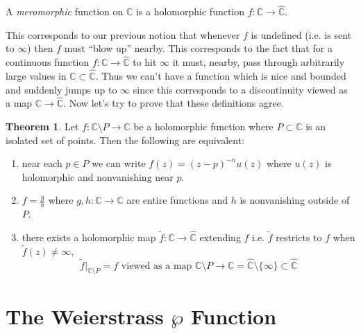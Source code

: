 \documentclass{article}
\newcommand{\C}{\mathbb{C}}
\theoremstyle{definition}
\newtheorem{theorem}{Theorem}[section]
\newenvironment{definition}[1][Definition:]{\begin{trivlist}
\item[\hskip \labelsep {\bfseries #1}]}{\end{trivlist}}
\begin{document}
\begin{definition}
A \textit{meromorphic} function on $\C$ is a holomorphic function $f : \C \to \hat{\C}$.
\end{definition}
\noindent
This corresponds to our previous notion that whenever $f$ is undefined (i.e. is sent to $\infty$) then $f$
must “blow up” nearby. This corresponds to the fact that for a continuous function $f : \C \to \hat{\C}$ to hit $\infty$ it must, nearby, pass through arbitrarily large values in $\C \subset \hat{\C}$. Thus we can’t have a function which is nice and bounded and suddenly jumps up to $\infty$ since this corresponds to a discontinuity
viewed as a map $\C \to \hat{\C}$. Now let’s try to prove that these definitions agree.

\begin{theorem}
Let $f : \C \setminus P \to \C$ be a holomorphic function where $P \subset \C$ is an isolated set of points. Then the following are equivalent:
\begin{enumerate}
\item near each $p \in P$ we can write $f(z) = (z - p)^{-n} u(z)$ where $u(z)$ is holomorphic and nonvanishing near $p$.
\item $f = \frac{g}{h}$ where $g,h : \C \to \C$ are entire functions and $h$ is nonvanishing outside of $P$.
\item there exists a holomorphic map $\tilde{f} : \C \to \hat{\C}$ extending $f$ i.e. $\tilde{f}$ restricts to $f$ when $\tilde{f}(z) \neq \infty$, 
\[ \tilde{f} |_{\C \setminus P} = f \text{ viewed as a map } \C \setminus P \to \C = \hat{\C} \setminus \{ \infty \} \subset \hat{\C} \]
\end{enumerate}
\end{theorem}

\section{The Weierstrass $\wp$ Function}
\end{document}
